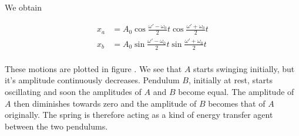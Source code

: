 \documentclass[a4paper,10pt]{article}
\begin{document}
We obtain

\begin{align*}
x_a &= A_0\cos{\frac{\omega\prime - \omega_0}{2}t}\cos{\frac{\omega\prime + \omega_0}{2}t}\\
x_b &= A_0\sin{\frac{\omega\prime - \omega_0}{2}t}\sin{\frac{\omega\prime + \omega_0}{2}t}\\
\end{align*}

These motions are plotted in figure . We see that $A$ starts swinging initially, but it's amplitude continuously decreases. Pendulum $B$, initially
at rest, starts oscillating and soon the amplitudes of $A$ and $B$ become equal. The amplitude of $A$ then diminishes towards zero and the amplitude
of $B$ becomes that of $A$ originally. The spring is therefore acting as a kind of energy transfer agent between the two pendulums.
\end{document}
